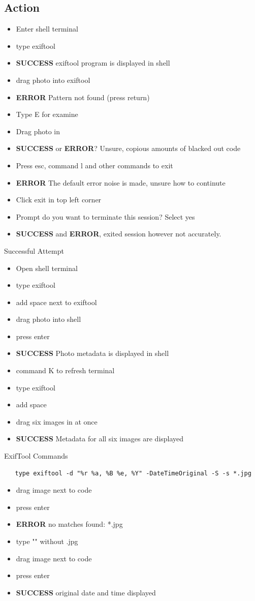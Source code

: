 \documentclass{article}
\begin{document}
\subsection{Action}
\begin{itemize}
\item Enter shell terminal
\item type exiftool
\item \textbf{SUCCESS} exiftool program is displayed in shell
\item drag photo into exiftool
\item \textbf{ERROR} Pattern not found (press return)
\item Type E for examine
\item Drag photo in
\item \textbf{SUCCESS} or \textbf{ERROR}? Unsure, copious amounts of blacked out code
\item Press esc, command l and other commands to exit 
\item \textbf{ERROR} The default error noise is made, unsure how to continute
\item Click exit in top left corner
\item Prompt do you want to terminate this session? Select yes
\item \textbf{SUCCESS} and \textbf{ERROR}, exited session however not accurately.
\end{itemize}
Successful Attempt
\begin{itemize}
\item Open shell terminal
\item type exiftool
\item add space next to exiftool
\item drag photo into shell
\item press enter
\item \textbf{SUCCESS} Photo metadata is displayed in shell
\item command K to refresh terminal
\item type exiftool
\item add space
\item drag six images in at once
\item \textbf{SUCCESS} Metadata for all six images are displayed
\end{itemize}
ExifTool Commands
\begin{verbatim}
   type exiftool -d "%r %a, %B %e, %Y" -DateTimeOriginal -S -s *.jpg 
\end{verbatim}
\begin{itemize}
\item drag image next to code
\item press enter
\item \textbf{ERROR} no matches found: *.jpg
\item type "" without .jpg  
\item drag image next to code
\item press enter
\item \textbf{SUCCESS} original date and time displayed
\end{itemize}
\end{document}
